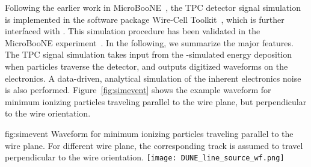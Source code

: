   
  Following the earlier work in MicroBooNE~\cite{Adams:2018dra}, the TPC detector signal simulation
  is implemented in the software package Wire-Cell Toolkit~\cite{ref:wire_cell_toolkit,ref:full_simulation}, which is 
  further interfaced with . This simulation procedure has been validated in the MicroBooNE experiment~\cite{Adams:2018gbi}. In
  the following, we summarize the major features. The TPC signal simulation takes input from the -simulated energy deposition when particles traverse the detector, and outputs digitized waveforms on the  electronics.
   A data-driven, analytical simulation of the inherent electronics noise is also performed. 
Figure~\ref{fig:simevent} shows the example waveform for minimum ionizing particles traveling parallel to 
the wire plane, but perpendicular to the wire orientation.  

\begin{dunefigure}
{fig:simevent}
{Waveform for minimum ionizing particles traveling parallel to the wire plane. For different
        wire plane, the corresponding track is assumed to travel perpendicular to the wire orientation.}
\texttt{[image: DUNE\_line\_source\_wf.png]}
\end{dunefigure}


